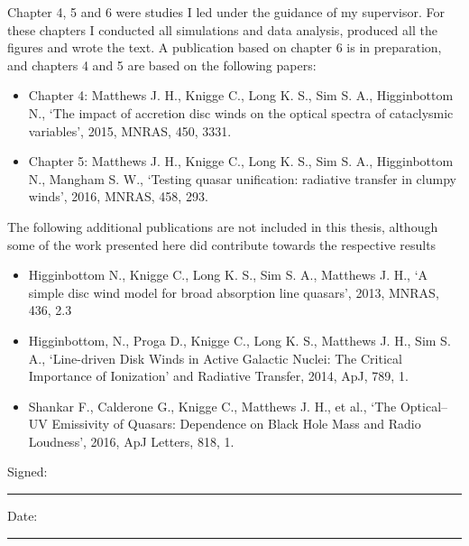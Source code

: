 \documentclass[a4paper, 11pt, twoside]{Thesis}  %
\begin{document}
{Chapter 4, 5 and 6 were studies I led under the guidance of my supervisor. For these
chapters I conducted all simulations and data analysis, produced all the figures and 
wrote the text. A publication based on chapter 6 is in preparation, and
chapters 4 and 5 are based on the following papers:
\begin{itemize}
	\item Chapter 4: Matthews J. H., Knigge C., Long K. S., Sim S. A., Higginbottom N., 
`The impact of accretion disc winds on the optical spectra of 
cataclysmic variables',
2015, MNRAS, 450, 3331.
	\item Chapter 5: Matthews J. H., Knigge C., Long K. S., Sim S. A., Higginbottom N., Mangham S. W., 
`Testing quasar unification: radiative transfer in clumpy winds',
2016, MNRAS, 458, 293.
\end{itemize}
The following additional publications are not included in this thesis, although some of the work 
presented here did contribute towards the respective results
\begin{itemize}
	\item Higginbottom N., Knigge C., Long K. S., Sim S. A., Matthews J. H., 
`A simple disc wind model for broad absorption line quasars', 2013,  
MNRAS, 436, 2.3
	\item Higginbottom, N., Proga D., Knigge C., Long K. S., Matthews J. H., Sim S. A.,
	`Line-driven Disk Winds in Active Galactic Nuclei: The Critical Importance of Ionization' 
	and Radiative Transfer, 2014, ApJ, 789, 1.
	\item Shankar F., Calderone G., Knigge C., Matthews J. H., et al., `The Optical–UV Emissivity of Quasars: Dependence on Black Hole Mass and Radio Loudness', 2016, ApJ Letters, 818, 1.
\end{itemize} 

\bigskip
\bigskip
\bigskip

Signed:\\
\rule[1em]{25em}{0.5pt}  %

\bigskip

Date:\\
\rule[1em]{25em}{0.5pt}  %
}
\clearpage  %

\end{document}
